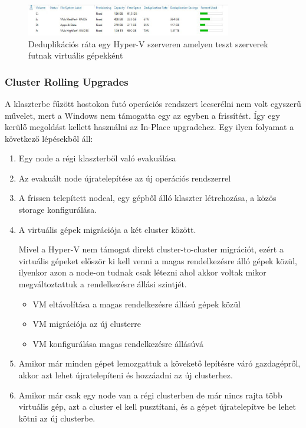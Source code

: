 \documentclass[12pt,oneside,justify]{book}
\begin{document}
\begin{figure}[h]
\centering
\includegraphics[width=0.8\textwidth]{deduplication-ratio-sample}
\caption{Deduplikációs ráta egy Hyper-V szerveren amelyen teszt szerverek futnak virtuális gépekként}
\label{fig:deduplication_ratio}
\end{figure}

\subsubsection{Cluster Rolling Upgrades}

A klaszterbe fűzött hostokon futó operációs rendszert lecserélni nem volt egyszerű művelet, mert a Windows nem támogatta egy az egyben a frissítést. Így egy kerülő megoldást kellett használni az In-Place upgradehez. Egy ilyen folyamat a következő lépésekből áll:
\begin{enumerate}
	\item Egy node a régi klaszterből való evakuálása
	\item Az evakuált node újratelepítése az új operációs rendszerrel
	\item A frissen telepített nodeal, egy gépből álló klaszter létrehozása, a közös storage konfigurálása.
 	\item A virtuális gépek migrációja a két cluster között.

Mivel a Hyper-V nem támogat direkt cluster-to-cluster migrációt, ezért a virtuális gépeket először ki kell venni a magas rendelkezésre álló gépek közül, ilyenkor azon a node-on tudnak csak létezni ahol akkor voltak mikor megváltoztattuk a rendelkezésre állási szintjét.
	\begin{itemize}
		
		\item VM eltávolítása a magas rendelkezésre állású gépek közül
		\item VM migrációja az új clusterre
		\item VM konfigurálása magas rendelkezésre állásúvá
	\end{itemize}
	\item Amikor már minden gépet lemozgattuk a kövekető lepítésre váró gazdagépről, akkor azt lehet újratelepíteni és hozzáadni az új clusterhez.
	\item Amikor már csak egy node van a régi clusterben de már nincs rajta több virtuális gép, azt a cluster el kell pusztítani, és a gépet újratelepítve be lehet kötni az új clusterbe.
\end{enumerate}
\end{document}
